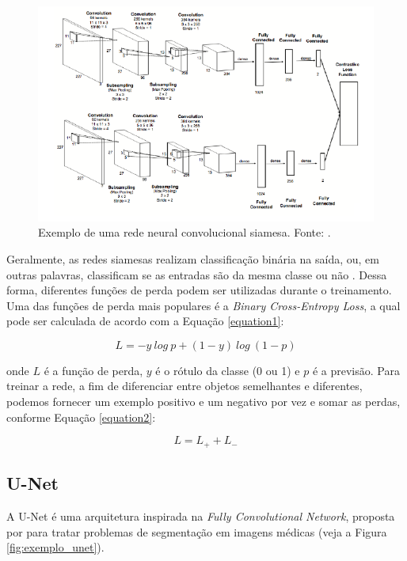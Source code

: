 \documentclass[12pt]{article}
\begin{document}
\begin{figure}[!ht]
    \centering
    \includegraphics[width = 1\textwidth]{figures/siameseCNN.png}
    \caption{Exemplo de uma rede neural convolucional siamesa. Fonte: \cite{rao2016deep}.}
    \label{fig:siameseCNN}
\end{figure}

Geralmente, as redes siamesas realizam classificação binária na saída, ou, em outras palavras, classificam se as entradas são da mesma classe ou não \cite{rao2016deep}. Dessa forma, diferentes funções de perda podem ser utilizadas durante o treinamento. Uma das funções de perda mais populares é a \textit{Binary Cross-Entropy Loss}, a qual pode ser calculada de acordo com a Equação \ref{equation1}:

\begin{equation}
    L = -y \ log \ p + (1 - y) \ log \ (1 - p)
    \label{equation1}
\end{equation}

\noindent onde $L$ é a função de perda, $y$ é o rótulo da classe (0 ou 1) e $p$ é a previsão. Para treinar a rede, a fim de diferenciar entre objetos semelhantes e diferentes, podemos fornecer um exemplo positivo e um negativo por vez e somar as perdas, conforme Equação \ref{equation2}:

\begin{equation}
    L = L_+ + L_-
    \label{equation2}
\end{equation}


\subsection{U-Net}

A U-Net é uma arquitetura inspirada na \textit{Fully Convolutional Network}, proposta por \cite{long2015fully} para tratar problemas de segmentação em imagens médicas (veja a Figura \ref{fig:exemplo_unet}).
\end{document}
